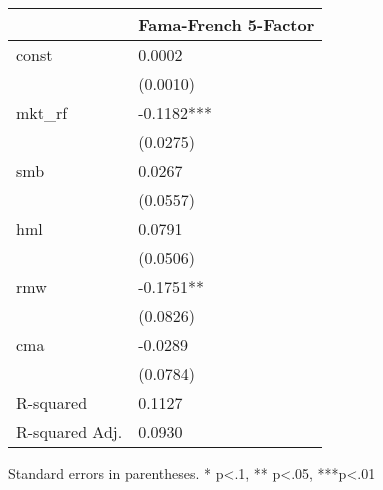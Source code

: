 \begin{table}
\caption{}
\label{}
\begin{center}
\begin{tabular}{ll}
\hline
               & Fama-French 5-Factor  \\
\hline
const          & 0.0002                \\
               & (0.0010)              \\
mkt\_rf        & -0.1182***            \\
               & (0.0275)              \\
smb            & 0.0267                \\
               & (0.0557)              \\
hml            & 0.0791                \\
               & (0.0506)              \\
rmw            & -0.1751**             \\
               & (0.0826)              \\
cma            & -0.0289               \\
               & (0.0784)              \\
R-squared      & 0.1127                \\
R-squared Adj. & 0.0930                \\
\hline
\end{tabular}
\end{center}
\end{table}
\bigskip
Standard errors in parentheses. \newline 
* p<.1, ** p<.05, ***p<.01
